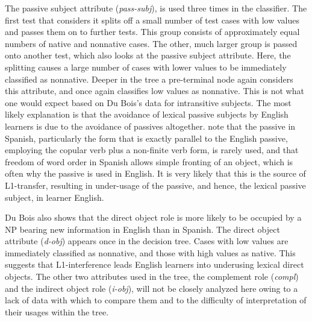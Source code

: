 \documentclass[main.tex]{subfiles}
\begin{document}
The passive subject attribute (\textit{pass-subj}), is used three times in the classifier. The first test that considers it splits off a small number of test cases with low values and passes them on to further tests. This group consists of approximately equal numbers of native and nonnative cases. The other, much larger group is passed onto another test, which also looks at the passive subject attribute. Here, the splitting causes a large number of cases with lower values to be immediately classified as nonnative. Deeper in the tree a pre-terminal node again considers this attribute, and once again classifies low values as nonnative. This is not what one would expect based on Du Bois's data for intransitive subjects. The most likely explanation is that the avoidance of lexical passive subjects by English learners is due to the avoidance of passives altogether. \citet[28.2.3]{butt} note that the passive in Spanish, particularly the form that is exactly parallel to the English passive, employing the copular verb plus a non-finite verb form, is rarely used, and that freedom of word order in Spanish allows simple fronting of an object, which is often why the passive is used in English. It is very likely that this is the source of L1-transfer, resulting in under-usage of the passive, and hence, the lexical passive subject, in learner English.

Du Bois also shows that the direct object role is more likely to be occupied by a NP bearing new information in English than in Spanish. The direct object attribute (\textit{d-obj}) appears once in the decision tree. Cases with low values are immediately classified as nonnative, and those with high values as native. This suggests that L1-interference leads English learners into underusing lexical direct objects. The other two attributes used in the tree, the complement role (\textit{compl}) and the indirect object role (\textit{i-obj}), will not be closely analyzed here owing to a lack of data with which to compare them and to the difficulty of interpretation of their usages within the tree.
\end{document}
